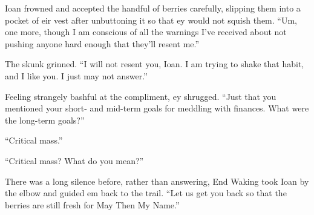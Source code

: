 Ioan frowned and accepted the handful of berries carefully, slipping them into a pocket of eir vest after unbuttoning it so that ey would not squish them. ``Um, one more, though I am conscious of all the warnings I've received about not pushing anyone hard enough that they'll resent me.''

The skunk grinned. ``I will not resent you, Ioan. I am trying to shake that habit, and I like you. I just may not answer.''

Feeling strangely bashful at the compliment, ey shrugged. ``Just that you mentioned your short- and mid-term goals for meddling with finances. What were the long-term goals?''

``Critical mass.''

``Critical mass? What do you mean?''

There was a long silence before, rather than answering, End Waking took Ioan by the elbow and guided em back to the trail. ``Let us get you back so that the berries are still fresh for May Then My Name.''
